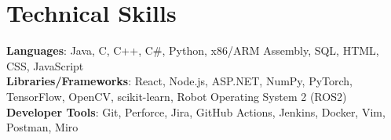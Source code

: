 \documentclass[letterpaper, 10pt]{article}
\begin{document}
\section{Technical Skills}
 \begin{itemize}[leftmargin=0.15in, label={}]
    \small{\item{
     \textbf{Languages}{: Java, C, C++, C\#, Python, x86/ARM Assembly, SQL, HTML, CSS, JavaScript} \\
     \textbf{Libraries/Frameworks}{: React, Node.js, ASP.NET, NumPy, PyTorch, TensorFlow, OpenCV, scikit-learn, Robot Operating System 2 (ROS2)} \\
     \textbf{Developer Tools}{: Git, Perforce, Jira, GitHub Actions, Jenkins, Docker, Vim, Postman, Miro} \\
    }}
 \end{itemize}


\end{document}
